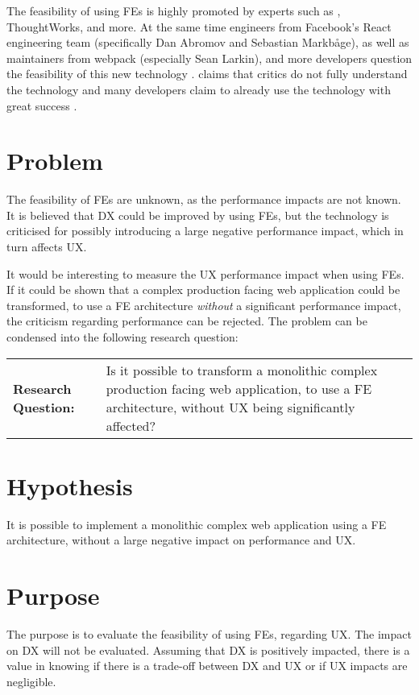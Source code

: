 \documentclass{article}
\newcommand{\fe}{\textmugreek FE}
\begin{document}
The feasibility of using \fe{}s is highly promoted by experts such as \citeauthor{Jackson2019}, ThoughtWorks, and more. At the same time engineers from Facebook's React engineering team (specifically Dan Abromov and Sebastian Markbåge), as well as maintainers from webpack (especially Sean Larkin), and more developers question the feasibility of this new technology \cite{Denning}. \citeauthor{Denning} claims that critics do not fully understand the technology and many developers claim to already use the technology with great success \cite{Noel,ThoughtWorks}.

\section{Problem}

The feasibility of \fe{}s are unknown, as the performance impacts are not known. It is believed that DX could be improved by using \fe{}s, but the technology is criticised for possibly introducing a large negative performance impact, which in turn affects UX.


It would be interesting to measure the UX performance impact when using \fe{}s. If it could be shown that a complex production facing web application could be transformed, to use a \fe{} architecture \textit{without} a significant performance impact, the criticism regarding performance can be rejected. The problem can be condensed into the following research question:

\begin{center}
\begin{tabular}{p{}p{}}
     \textbf{Research Question:} & Is it possible to transform a monolithic complex production facing web application, to use a \fe{} architecture, without UX being significantly affected?
\end{tabular}
\end{center}

\section{Hypothesis}
It is possible to implement a monolithic complex web application using a \fe{} architecture, without a large negative impact on performance and UX.

\section{Purpose}
The purpose is to evaluate the feasibility of using \fe{}s, regarding UX. The impact on DX will not be evaluated. Assuming that DX is positively impacted, there is a value in knowing if there is a trade-off between DX and UX or if UX impacts are negligible.
\end{document}
